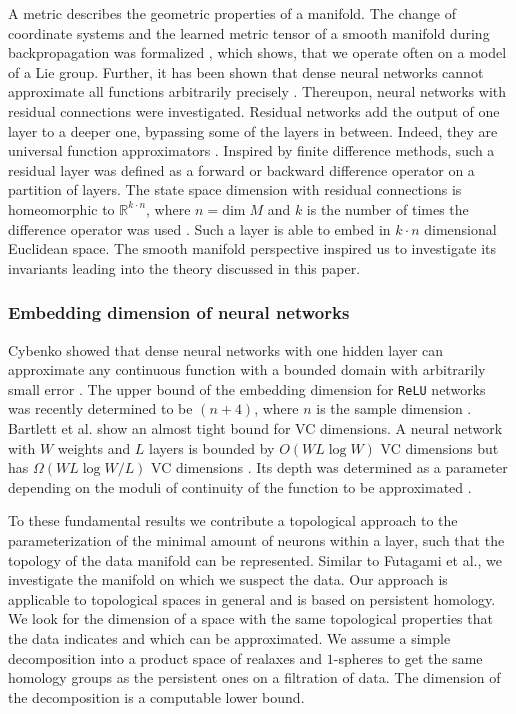 \documentclass[runningheads,orivec]{llncs}
\begin{document}
A metric describes the geometric properties of a manifold. The change of coordinate systems and the learned metric tensor of a smooth manifold during backpropagation was formalized \cite{HauserR17}, which shows, that we operate often on a model of a Lie group. Further, it has been shown that dense neural networks cannot approximate all functions arbitrarily precisely \cite{Johnson19}. Thereupon, neural networks with residual connections were investigated. Residual networks add the output of one layer to a deeper one, bypassing some of the layers in between. Indeed, they are universal function approximators \cite{LinJ18}. Inspired by finite difference methods, such a residual layer was defined as a forward or backward difference operator on a partition of layers. The state space dimension with residual connections is homeomorphic to $\mathbb{R}^{k \cdot n}$, where $n = \text{dim} \; M$ and $k$ is the number of times the difference operator was used \cite{HauserGJR19}. Such a layer is able to embed in $k\cdot n$ dimensional Euclidean space. The smooth manifold perspective inspired us to investigate its invariants leading into the theory discussed in this paper.

\subsubsection*{Embedding dimension of neural networks} Cybenko showed that dense neural networks with one hidden layer can approximate any continuous function with a bounded domain with arbitrarily small error \cite{Cybenko92}. The upper bound of the embedding dimension for \texttt{ReLU} networks was recently determined to be $(n+4)$, where $n$ is the sample dimension \cite{RaghuPKGS17}. Bartlett et al. show an almost tight bound for VC dimensions. A neural network with $W$ weights and $L$ layers is bounded by $O(WL \log W)$ VC dimensions but has $\Omega(WL \log W/L)$ VC dimensions \cite{BartlettHLM19}. Its depth was determined as a parameter depending on the moduli of continuity of the function to be approximated \cite{LinJ18}. 

To these fundamental results we contribute a topological approach to the parameterization of the minimal amount of neurons within a layer, such that the topology of the data manifold can be represented. Similar to Futagami et al.\cite{FutagamiYS19}, we investigate the manifold on which we suspect the data. Our approach is applicable to topological spaces in general and is based on persistent homology. We look for the dimension of a space with the same topological properties that the data indicates and which can be approximated. We assume a simple decomposition into a product space of realaxes and $1$-spheres to get the same homology groups as the persistent ones on a filtration of data. The dimension of the decomposition is a computable lower bound.
\end{document}
